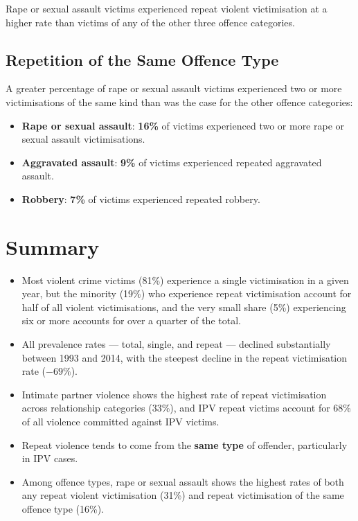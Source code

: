 \documentclass[11pt,a4paper,openany]{report}
\theoremstyle{definition}
\theoremstyle{plain}
\theoremstyle{remark}
\begin{document}
Rape or sexual assault victims experienced repeat violent victimisation at a higher rate than victims of any of the other three offence categories.

\subsection{Repetition of the Same Offence Type}

A greater percentage of rape or sexual assault victims experienced two or more victimisations of the same kind than was the case for the other offence categories:

\begin{itemize}
    \item \textbf{Rape or sexual assault}: \textbf{16\%} of victims experienced two or more rape or sexual assault victimisations.
    \item \textbf{Aggravated assault}: \textbf{9\%} of victims experienced repeated aggravated assault.
    \item \textbf{Robbery}: \textbf{7\%} of victims experienced repeated robbery.
\end{itemize}

\section{Summary}

\begin{itemize}
    \item Most violent crime victims (81\%) experience a single victimisation in a given year, but the minority (19\%) who experience repeat victimisation account for half of all violent victimisations, and the very small share (5\%) experiencing six or more accounts for over a quarter of the total.
    \item All prevalence rates --- total, single, and repeat --- declined substantially between 1993 and 2014, with the steepest decline in the repeat victimisation rate ($-69\%$).
    \item Intimate partner violence shows the highest rate of repeat victimisation across relationship categories (33\%), and IPV repeat victims account for 68\% of all violence committed against IPV victims.
    \item Repeat violence tends to come from the \textbf{same type} of offender, particularly in IPV cases.
    \item Among offence types, rape or sexual assault shows the highest rates of both any repeat violent victimisation (31\%) and repeat victimisation of the same offence type (16\%).
\end{itemize}
\end{document}
